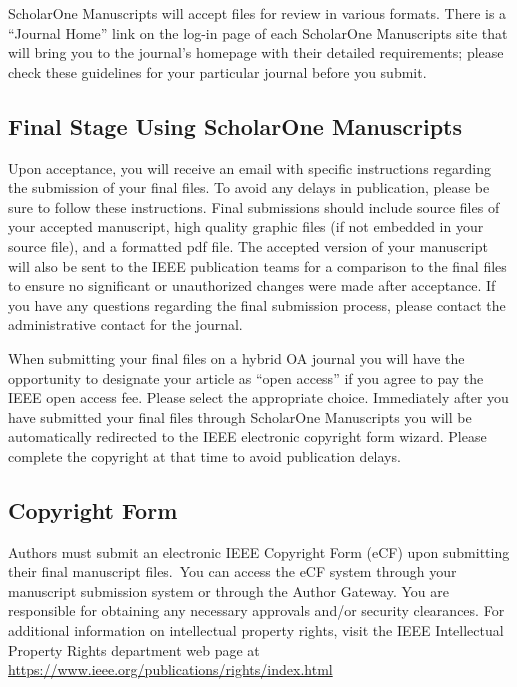 \documentclass{IEEEtaes}
\begin{document}
ScholarOne Manuscripts will accept files for review in various formats. There is a ``Journal Home'' link on the log-in page of each ScholarOne Manuscripts site that will bring you to the journal's homepage with their detailed requirements; please check these guidelines for your particular journal before you submit.

\subsection{Final Stage Using ScholarOne Manuscripts}

Upon acceptance, you will receive an email with specific instructions regarding the submission of your final files. To avoid any delays in publication, please be sure to follow these instructions. Final submissions should include source files of your accepted manuscript, high quality graphic files (if not embedded in your source file), and a formatted pdf file. The accepted version of your manuscript will also be sent to the IEEE publication teams for a comparison to the final files to ensure no significant or unauthorized changes were made after acceptance. If you have any questions regarding the final submission process, please contact the administrative contact for the journal.

When submitting your final files on a hybrid OA journal you will have the opportunity to designate your article as ``open access'' if you agree to pay the IEEE open access fee. Please select the appropriate choice. Immediately after you have submitted your final files through ScholarOne Manuscripts you will be automatically redirected to the IEEE electronic copyright form wizard. Please complete the copyright at that time to avoid publication delays.

\subsection{Copyright Form}

Authors must submit an electronic IEEE Copyright Form (eCF) upon submitting their final manuscript files.~You can access the eCF system through your manuscript submission system or through the Author Gateway. You are responsible for obtaining any necessary approvals and/or security clearances. For additional information on intellectual property rights, visit the IEEE Intellectual Property Rights department web page at \href{https://www.ieee.org/publications/rights/index.html}{\url{https://www.ieee.org/publications/rights/index.html}}
\end{document}
